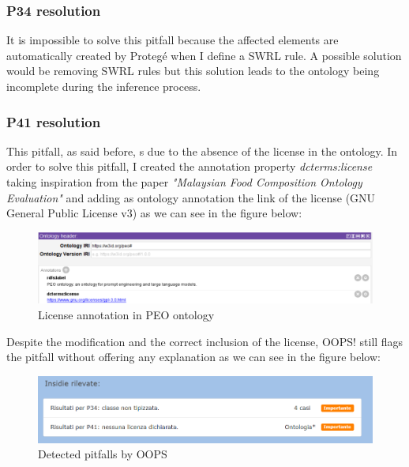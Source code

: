 \subsubsection{P34 resolution}
It is impossible to solve this pitfall because the affected elements are automatically created by Protegé when I define a SWRL rule. A possible solution would be removing SWRL rules but this solution leads to the ontology being incomplete during the inference process.

\subsubsection{P41 resolution}
This pitfall, as said before, s due to the absence of the license in the ontology. In order to solve this pitfall, I created the annotation property \textit{dcterms:license} taking inspiration from the paper \textit{"Malaysian Food Composition Ontology Evaluation"}\cite{yusof2019malaysian} and adding as ontology annotation the link of the license (GNU General Public License v3) as we can see in the figure below:
\begin{figure}[H]
    \centering
    \includegraphics[width=0.9\linewidth]{Figures/fig_79.png}
    \caption{License annotation in PEO ontology}
    \label{fig:enter-label}
\end{figure}

Despite the modification and the correct inclusion of the license, OOPS! still flags the pitfall without offering any explanation as we can see in the figure below:
\begin{figure}[H]
    \centering
    \includegraphics[width=0.9\linewidth]{Figures/fig_80.png}
    \caption{Detected pitfalls by OOPS}
    \label{fig:enter-label}
\end{figure}

